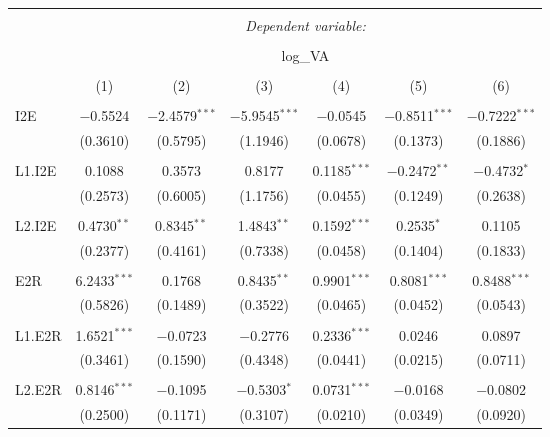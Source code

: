 
\begin{table}[!htbp] \centering 
  \caption{} 
  \label{} 
\begin{tabular}{@{\extracolsep{5pt}}lcccccc} 
\\[-1.8ex]\hline 
\hline \\[-1.8ex] 
 & \multicolumn{6}{c}{\textit{Dependent variable:}} \\ 
\cline{2-7} 
\\[-1.8ex] & \multicolumn{6}{c}{log\_VA} \\ 
\\[-1.8ex] & (1) & (2) & (3) & (4) & (5) & (6)\\ 
\hline \\[-1.8ex] 
 I2E & $-$0.5524 & $-$2.4579$^{***}$ & $-$5.9545$^{***}$ & $-$0.0545 & $-$0.8511$^{***}$ & $-$0.7222$^{***}$ \\ 
  & (0.3610) & (0.5795) & (1.1946) & (0.0678) & (0.1373) & (0.1886) \\ 
  & & & & & & \\ 
 L1.I2E & 0.1088 & 0.3573 & 0.8177 & 0.1185$^{***}$ & $-$0.2472$^{**}$ & $-$0.4732$^{*}$ \\ 
  & (0.2573) & (0.6005) & (1.1756) & (0.0455) & (0.1249) & (0.2638) \\ 
  & & & & & & \\ 
 L2.I2E & 0.4730$^{**}$ & 0.8345$^{**}$ & 1.4843$^{**}$ & 0.1592$^{***}$ & 0.2535$^{*}$ & 0.1105 \\ 
  & (0.2377) & (0.4161) & (0.7338) & (0.0458) & (0.1404) & (0.1833) \\ 
  & & & & & & \\ 
 E2R & 6.2433$^{***}$ & 0.1768 & 0.8435$^{**}$ & 0.9901$^{***}$ & 0.8081$^{***}$ & 0.8488$^{***}$ \\ 
  & (0.5826) & (0.1489) & (0.3522) & (0.0465) & (0.0452) & (0.0543) \\ 
  & & & & & & \\ 
 L1.E2R & 1.6521$^{***}$ & $-$0.0723 & $-$0.2776 & 0.2336$^{***}$ & 0.0246 & 0.0897 \\ 
  & (0.3461) & (0.1590) & (0.4348) & (0.0441) & (0.0215) & (0.0711) \\ 
  & & & & & & \\ 
 L2.E2R & 0.8146$^{***}$ & $-$0.1095 & $-$0.5303$^{*}$ & 0.0731$^{***}$ & $-$0.0168 & $-$0.0802 \\ 
  & (0.2500) & (0.1171) & (0.3107) & (0.0210) & (0.0349) & (0.0920) \\ 

\end{tabular}
\end{table}
